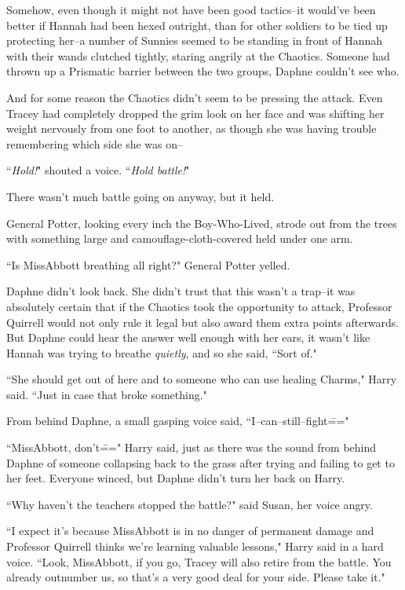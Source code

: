 Somehow, even though it might not have been good tactics\---it would've been better if Hannah had been hexed outright, than for other soldiers to be tied up protecting her\---a number of Sunnies seemed to be standing in front of Hannah with their wands clutched tightly, staring angrily at the Chaotics. Someone had thrown up a Prismatic barrier between the two groups, Daphne couldn't see who.

And for some reason the Chaotics didn't seem to be pressing the attack. Even Tracey had completely dropped the grim look on her face and was shifting her weight nervously from one foot to another, as though she was having trouble remembering which side she was on\---

``\emph{Hold!}" shouted a voice. ``\emph{Hold battle!}"

There wasn't much battle going on anyway, but it held.

General Potter, looking every inch the Boy-Who-Lived, strode out from the trees with something large and camouflage-cloth-covered held under one arm.

``Is Miss\?Abbott breathing all right?" General Potter yelled.

Daphne didn't look back. She didn't trust that this wasn't a trap\---it was absolutely certain that if the Chaotics took the opportunity to attack, Professor Quirrell would not only rule it legal but also award them extra points afterwards. But Daphne could hear the answer well enough with her ears, it wasn't like Hannah was trying to breathe \emph{quietly}, and so she said, ``Sort of."

``She should get out of here and to someone who can use healing Charms," Harry said. ``Just in case that broke something."

From behind Daphne, a small gasping voice said, ``I\---can\---still\---fight\==="

``Miss\?Abbott, don't\===" Harry said, just as there was the sound from behind Daphne of someone collapsing back to the grass after trying and failing to get to her feet. Everyone winced, but Daphne didn't turn her back on Harry.

``Why haven't the teachers stopped the battle?" said Susan, her voice angry.

``I expect it's because Miss\?Abbott is in no danger of permanent damage and Professor Quirrell thinks we're learning valuable lessons," Harry said in a hard voice. ``Look, Miss\?Abbott, if you go, Tracey will also retire from the battle. You already outnumber us, so that's a very good deal for your side. Please take it."

